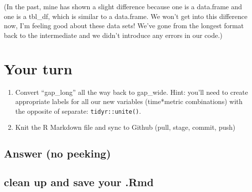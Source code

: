 \documentclass[]{book}
\newenvironment{Shaded}{\begin{snugshade}}{\end{snugshade}}
\newcommand{\KeywordTok}[1]{\textcolor[rgb]{0.13,0.29,0.53}{\textbf{#1}}}
\newcommand{\DataTypeTok}[1]{\textcolor[rgb]{0.13,0.29,0.53}{#1}}
\newcommand{\StringTok}[1]{\textcolor[rgb]{0.31,0.60,0.02}{#1}}
\newcommand{\CommentTok}[1]{\textcolor[rgb]{0.56,0.35,0.01}{\textit{#1}}}
\newcommand{\OperatorTok}[1]{\textcolor[rgb]{0.81,0.36,0.00}{\textbf{#1}}}
\newcommand{\NormalTok}[1]{#1}
\theoremstyle{definition}
\theoremstyle{definition}
\theoremstyle{definition}
\theoremstyle{remark}
\begin{document}
(In the past, mine has shown a slight difference because one is a
data.frame and one is a tbl\_df, which is similar to a data.frame. We
won't get into this difference now, I'm feeling good about these data
sets! We've gone from the longest format back to the intermediate and we
didn't introduce any errors in our code.)

\section{Your turn}\label{your-turn-11}

\begin{enumerate}
\def\labelenumi{\arabic{enumi}.}
\item
  Convert ``gap\_long'' all the way back to gap\_wide. Hint: you'll need
  to create appropriate labels for all our new variables (time*metric
  combinations) with the opposite of separate: \texttt{tidyr::unite()}.
\item
  Knit the R Markdown file and sync to Github (pull, stage, commit,
  push)
\end{enumerate}

\subsection{Answer (no peeking)}\label{answer-no-peeking-2}

\begin{Shaded}
\end{Shaded}

\subsection{clean up and save your
.Rmd}\label{clean-up-and-save-your-.rmd}
\end{document}
